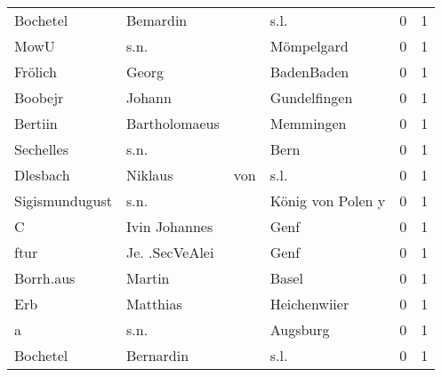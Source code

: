 \begin{tabular}{llllrr}
                 Bochetel &                           Bemardin &             &                                        s.l. &          0 &         1 \\
                     MowU &                               s.n. &             &                                  Mömpelgard &          0 &         1 \\
                  Frölich &                              Georg &             &                                  BadenBaden &          0 &         1 \\
                  Boobejr &                             Johann &             &                                Gundelfingen &          0 &         1 \\
                  Bertiin &                      Bartholomaeus &             &                                   Memmingen &          0 &         1 \\
                Sechelles &                               s.n. &             &                                        Bern &          0 &         1 \\
                 Dlesbach &                            Niklaus &         von &                                        s.l. &          0 &         1 \\
           Sigismundugust &                               s.n. &             &                           König von Polen y &          0 &         1 \\
                        C &                      Ivin Johannes &             &                                        Genf &          0 &         1 \\
                     ftur &                     Je. .SecVeAlei &             &                                        Genf &          0 &         1 \\
                Borrh.aus &                             Martin &             &                                       Basel &          0 &         1 \\
                      Erb &                           Matthias &             &                                Heichenwiier &          0 &         1 \\
                        a &                               s.n. &             &                                    Augsburg &          0 &         1 \\
                 Bochetel &                          Bernardin &             &                                        s.l. &          0 &         1 \\

\end{tabular}
